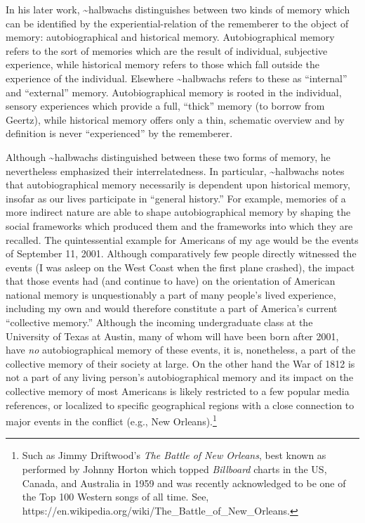 In his later work, \textasciitilde{}halbwachs distinguishes between two
kinds of memory which can be identified by the experiential-relation of
the rememberer to the object of memory: autobiographical and historical
memory.\autocite[52]{halbwachs1980} Autobiographical memory refers to
the sort of memories which are the result of individual, subjective
experience, while historical memory refers to those which fall outside
the experience of the individual. Elsewhere \textasciitilde{}halbwachs
refers to these as ``internal'' and ``external'' memory.
Autobiographical memory is rooted in the individual, sensory experiences
which provide a full, ``thick'' memory (to borrow from Geertz), while
historical memory offers only a thin, schematic overview and by
definition is never ``experienced'' by the rememberer.

Although \textasciitilde{}halbwachs distinguished between these two
forms of memory, he nevertheless emphasized their interrelatedness. In
particular, \textasciitilde{}halbwachs notes that autobiographical
memory necessarily is dependent upon historical memory, insofar as our
lives participate in ``general history.''\autocite[52]{halbwachs1980}
For example, memories of a more indirect nature are able to shape
autobiographical memory by shaping the social frameworks which produced
them and the frameworks into which they are recalled. The quintessential
example for Americans of my age would be the events of September 11,
2001. Although comparatively few people directly witnessed the events (I
was asleep on the West Coast when the first plane crashed), the impact
that those events had (and continue to have) on the orientation of
American national memory is unquestionably a part of many people's lived
experience, including my own and would therefore constitute a part of
America's current ``collective memory.'' Although the incoming
undergraduate class at the University of Texas at Austin, many of whom
will have been born after 2001, have \emph{no} autobiographical memory
of these events, it is, nonetheless, a part of the collective memory of
their society at large. On the other hand the War of 1812 is not a part
of any living person's autobiographical memory and its impact on the
collective memory of most Americans is likely restricted to a few
popular media references, or localized to specific geographical regions
with a close connection to major events in the conflict (e.g., New
Orleans).\footnote{Such as Jimmy Driftwood's \emph{The Battle of New
  Orleans}, best known as performed by Johnny Horton which topped
  \emph{Billboard} charts in the US, Canada, and Australia in 1959 and
  was recently acknowledged to be one of the Top 100 Western songs of
  all time. See,
  https://en.wikipedia.org/wiki/The\_Battle\_of\_New\_Orleans.}

